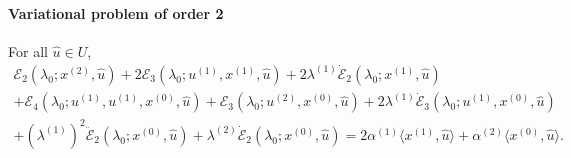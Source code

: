 \documentclass[12pt, final]{scrartcl}
\theoremstyle{definition}
\newcommand{\E}{\mathcal E}
\newcommand{\order}[2][1]{#2^{(#1)}}
\begin{document}
\paragraph{Variational problem of order 2} For all $\hat{u} \in U$,
\begin{multline*}
    \E_2(\lambda_0; \order[2]x, \hat{u})
    + 2\E_3(\lambda_0; \order[1]u, \order[1]x, \hat{u})
    + 2 \order[1]\lambda \dot{\E}_2(\lambda_0; \order[1]x, \hat{u})\\
    + \E_4(\lambda_0; \order[1]u, \order[1]u, \order[0]x, \hat{u})
    + \E_3(\lambda_0; \order[2]u, \order[0]x, \hat{u})
    + 2\order[1]\lambda \dot{\E}_3(\lambda_0; \order[1]u, \order[0]x, \hat{u})\\
    + ( \order[1]\lambda )^2 \ddot{\E}_2(\lambda_0; \order[0]x, \hat{u})
    + \order[2]\lambda \dot{\E}_2(\lambda_0; \order[0]x, \hat{u})
    = 2 \order[1]α \langle \order[1]x, \hat{u} \rangle
    + \order[2]α \langle \order[0]x, \hat{u} \rangle.
\end{multline*}
\end{document}
